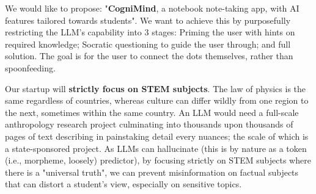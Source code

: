 We would like to propose: "\textbf{CogniMind}, a notebook note-taking app, with AI features tailored towards students".
We want to achieve this by purposefully restricting the LLM's capability into 3 stages: Priming the user with hints on
required knowledge; Socratic questioning to guide the user through; and full solution. The goal is for the user to
connect the dots themselves, rather than spoonfeeding.

Our startup will \textbf{strictly focus on STEM subjects}. The law of physics is the same regardless of countries,
whereas culture can differ wildly from one region to the next, sometimes within the same country. An LLM would need a
full-scale anthropology research project culminating into thousands upon thousands of pages of text describing in
painstaking detail every nuances; the scale of which is a state-sponsored project. As LLMs can hallucinate (this is by
nature as a token (i.e., morpheme, loosely) predictor), by focusing strictly on STEM subjects where there is a
"universal truth", we can prevent misinformation on factual subjects that can distort a student's view, especially on
sensitive topics.